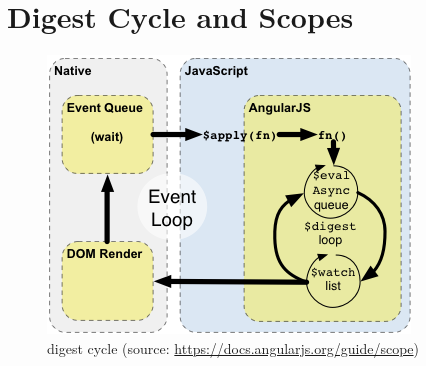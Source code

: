 \section{Digest Cycle and Scopes}

\begin{figure}[h]
  \centerline{
    \includegraphics[width=0.8\linewidth]{images/concepts-runtime.png}
  }
  \caption[digest cycle (source: \url{https://docs.angularjs.org/guide/scope})]{digest cycle (source: \url{https://docs.angularjs.org/guide/scope})}
  \label{fig:}
\end{figure}